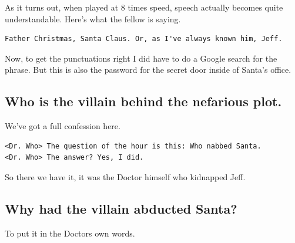\documentclass[writeup.tex]{subfiles}
\begin{document}
		As it turns out, when played at 8 times speed, speech actually becomes quite understandable. Here's what the fellow is saying.
		
		\begin{lstlisting}[backgroundcolor=\color{gray!25},basicstyle=\ttfamily,columns=fullflexible,breaklines]
Father Christmas, Santa Claus. Or, as I've always known him, Jeff.
		\end{lstlisting}
		
		Now, to get the punctuations right I did have to do a Google search for the phrase. But this is also the password for the secret door inside of Santa's office.
		
	\subsection{Who is the villain behind the nefarious plot.}
		We've got a full confession here.
		
\begin{lstlisting}[backgroundcolor=\color{gray!25},basicstyle=\ttfamily,columns=fullflexible,breaklines]
<Dr. Who> The question of the hour is this: Who nabbed Santa.
<Dr. Who> The answer? Yes, I did.
\end{lstlisting}

		So there we have it, it was the Doctor himself who kidnapped Jeff.
		
	\subsection{Why had the villain abducted Santa?}
		To put it in the Doctors own words.
				
\end{document}
